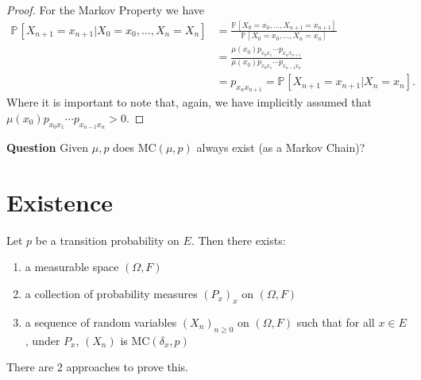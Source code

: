 \begin{proof}
For the Markov Property we have
\begin{align}
	\mathbb{P}_{} \left[ X_{n+1} = x_{n+1} | X_0 =x_0, \ldots ,X_n=X_n \right] &=
		\frac{\mathbb{P}_{} \left[ X_0=x_0, \ldots , X_{n+1}=x_{n+1} \right] }
		{\mathbb{P}_{} \left[ X_0=x_0 , \ldots , X_{n}=x_{n} \right]} \\
	&= \frac{\mu(x_0)p_{x_0 x_1}  \cdots  p_{x_{n}x_{n+1}}} {\mu(x_0)p_{x_0x_1} \cdots p_{x_{n-1}x_{n}}} \\
	&= p_{x_n x_{n+1}} = \mathbb{P}_{} \left[ X_{n+1} = x_{n+1} | X_n=x_n \right] 
.\end{align}
Where it is important to note that, again,  we have implicitly assumed that \newline $\mu(x_0)p_{x_0x_1} \cdots p_{x_{n-1}x_n}>0$. 

\end{proof}


\textbf{Question} Given $\mu, p$ does $ \textrm{MC}(\mu, p)$ always exist (as a Markov Chain)?

\section{Existence}

\begin{theorem}
	Let $p$ be a transition probability on $E$. Then there exists:
\begin{enumerate}
	\item a measurable space $(\Omega, F)$
	\item a collection of probability measures $(P_x)_{x}$ on $(\Omega, F)$
	\item a sequence of random variables $(X_n)_{n \geq 0}$ on $(\Omega, F)$ such that for all $x\in E$, under $P_x$, $(X_n)$ is  $ \textrm{MC}(\delta_x, p)$
\end{enumerate}

\end{theorem}

There are 2 approaches to prove this. 

